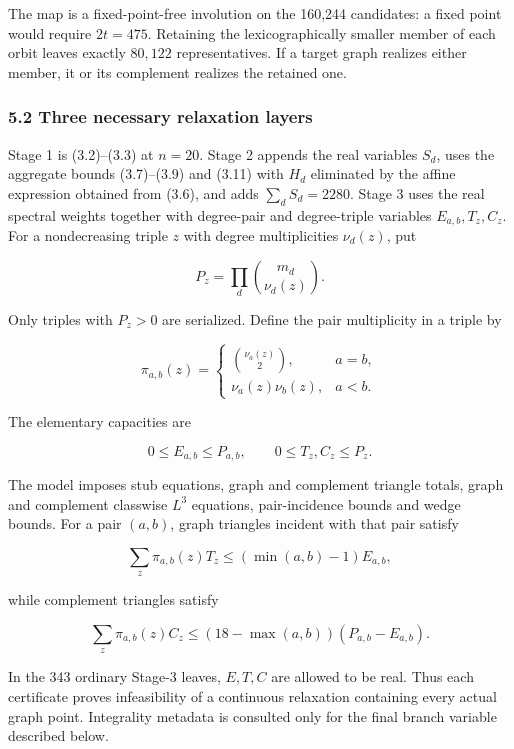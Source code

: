 \documentclass[
  english,
  11pt,
  a4paper,
]{article}
\begin{document}
The map is a fixed-point-free involution on the 160,244 candidates: a
fixed point would require \(2t=475\). Retaining the lexicographically
smaller member of each orbit leaves exactly \(80{,}122\)
representatives. If a target graph realizes either member, it or its
complement realizes the retained one.

\subsubsection{5.2 Three necessary relaxation
layers}\label{three-necessary-relaxation-layers}

Stage 1 is (3.2)--(3.3) at \(n=20\). Stage 2 appends the real variables
\(S_d\), uses the aggregate bounds (3.7)--(3.9) and (3.11) with \(H_d\)
eliminated by the affine expression obtained from (3.6), and adds
\(\sum_dS_d=2280\). Stage 3 uses the real spectral weights together with
degree-pair and degree-triple variables \(E_{a,b},T_z,C_z\). For a
nondecreasing triple \(z\) with degree multiplicities \(\nu_d(z)\), put

\[
P_z=\prod_d\binom{m_d}{\nu_d(z)}.
\]

Only triples with \(P_z>0\) are serialized. Define the pair multiplicity
in a triple by

\[
\pi_{a,b}(z)=
\begin{cases}
\binom{\nu_a(z)}2,&a=b,\\
\nu_a(z)\nu_b(z),&a<b.
\end{cases}
\tag{5.4a}
\]

The elementary capacities are

\[
0\le E_{a,b}\le P_{a,b},
\qquad
0\le T_z,C_z\le P_z.
\tag{5.4}
\]

The model imposes stub equations, graph and complement triangle totals,
graph and complement classwise \(L^3\) equations, pair-incidence bounds
and wedge bounds. For a pair \((a,b)\), graph triangles incident with
that pair satisfy

\[
\sum_z\pi_{a,b}(z)T_z
\le(\min(a,b)-1)E_{a,b},
\tag{5.5}
\]

while complement triangles satisfy

\[
\sum_z\pi_{a,b}(z)C_z
\le(18-\max(a,b))(P_{a,b}-E_{a,b}).
\tag{5.6}
\]

In the 343 ordinary Stage-3 leaves, \(E,T,C\) are allowed to be real.
Thus each certificate proves infeasibility of a continuous relaxation
containing every actual graph point. Integrality metadata is consulted
only for the final branch variable described below.
\end{document}
